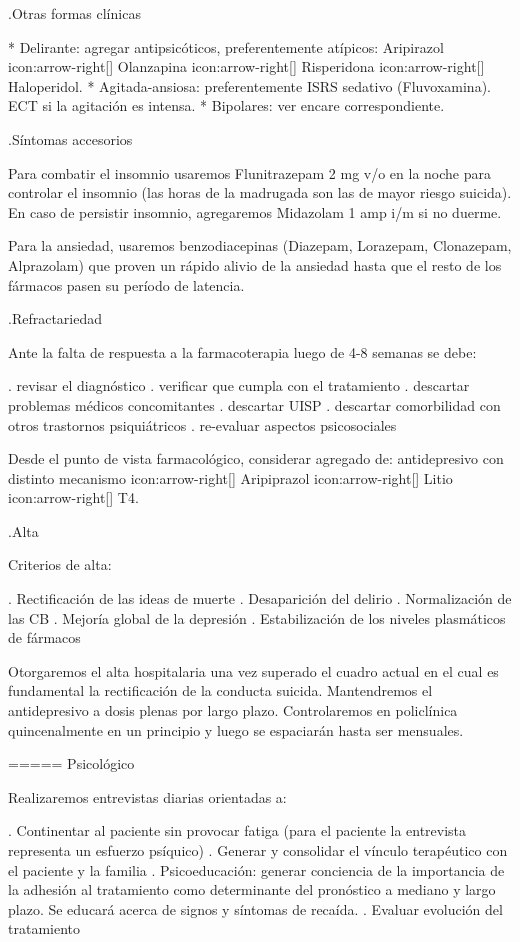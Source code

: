 .Otras formas clínicas

* Delirante: agregar antipsicóticos, preferentemente atípicos: Aripirazol icon:arrow-right[] Olanzapina icon:arrow-right[] Risperidona icon:arrow-right[] Haloperidol.
* Agitada-ansiosa: preferentemente ISRS sedativo (Fluvoxamina). ECT si la agitación es intensa.
* Bipolares: ver encare correspondiente.

.Síntomas accesorios

Para combatir el insomnio usaremos Flunitrazepam 2 mg v/o en la noche para controlar el insomnio (las horas de la madrugada son las de mayor riesgo suicida). En caso de persistir insomnio, agregaremos Midazolam 1 amp i/m si no duerme.

Para la ansiedad, usaremos benzodiacepinas (Diazepam, Lorazepam, Clonazepam, Alprazolam) que proven un rápido alivio de la ansiedad hasta que el resto de los fármacos pasen su período de latencia.

.Refractariedad

Ante la falta de respuesta a la farmacoterapia luego de 4-8 semanas se debe:

. revisar el diagnóstico
. verificar que cumpla con el tratamiento
. descartar problemas médicos concomitantes
. descartar UISP
. descartar comorbilidad con otros trastornos psiquiátricos
. re-evaluar aspectos psicosociales

Desde el punto de vista farmacológico, considerar agregado de: antidepresivo con distinto mecanismo icon:arrow-right[] Aripiprazol icon:arrow-right[] Litio icon:arrow-right[] T4.

.Alta

Criterios de alta:

. Rectificación de las ideas de muerte
. Desaparición del delirio
. Normalización de las CB
. Mejoría global de la depresión
. Estabilización de los niveles plasmáticos de fármacos

Otorgaremos el alta hospitalaria una vez superado el cuadro actual en el cual es fundamental la rectificación de la conducta suicida. Mantendremos el antidepresivo a dosis plenas por largo plazo. Controlaremos en policlínica quincenalmente en un principio y luego se espaciarán hasta ser mensuales.

===== Psicológico

Realizaremos entrevistas diarias orientadas a:

. Continentar al paciente sin provocar fatiga (para el paciente la entrevista representa un esfuerzo psíquico)
. Generar y consolidar el vínculo terapéutico con el paciente y la familia
. Psicoeducación: generar conciencia de la importancia de la adhesión al tratamiento como determinante del pronóstico a mediano y largo plazo. Se educará acerca de signos y síntomas de recaída.
. Evaluar evolución del tratamiento

